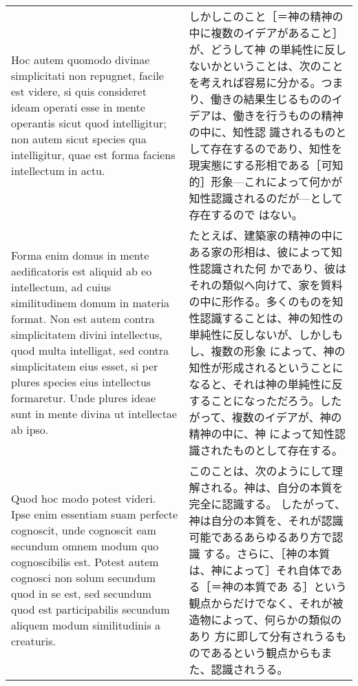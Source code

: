 \documentclass[10pt]{jsarticle} %
\begin{document}
\begin{longtable}{p{21em}p{21em}}
Hoc autem quomodo divinae simplicitati non repugnet, facile est
videre, si quis consideret ideam operati esse in mente operantis sicut
quod intelligitur; non autem sicut species qua intelligitur, quae est
forma faciens intellectum in actu.

&

しかしこのこと［＝神の精神の中に複数のイデアがあること］が、どうして神
の単純性に反しないかということは、次のことを考えれば容易に分かる。つま
り、働きの結果生じるもののイデアは、働きを行うものの精神の中に、知性認
識されるものとして存在するのであり、知性を現実態にする形相である［可知
的］形象---これによって何かが知性認識されるのだが---として存在するので
はない。


\\


Forma enim domus in mente aedificatoris est aliquid ab eo intellectum,
ad cuius similitudinem domum in materia format. Non est autem contra
simplicitatem divini intellectus, quod multa intelligat, sed contra
simplicitatem eius esset, si per plures species eius intellectus
formaretur. Unde plures ideae sunt in mente divina ut intellectae ab
ipso.


&

たとえば、建築家の精神の中にある家の形相は、彼によって知性認識された何
かであり、彼はそれの類似へ向けて、家を質料の中に形作る。多くのものを知
性認識することは、神の知性の単純性に反しないが、しかしもし、複数の形象
によって、神の知性が形成されるということになると、それは神の単純性に反
することになっただろう。したがって、複数のイデアが、神の精神の中に、神
によって知性認識されたものとして存在する。


\\


Quod hoc modo potest videri. Ipse enim essentiam suam perfecte
cognoscit, unde cognoscit eam secundum omnem modum quo cognoscibilis
est. Potest autem cognosci non solum secundum quod in se est, sed
secundum quod est participabilis secundum aliquem modum similitudinis
a creaturis.

&

このことは、次のようにして理解される。神は、自分の本質を完全に認識する。
したがって、神は自分の本質を、それが認識可能であるあらゆるあり方で認識
する。さらに、［神の本質は、神によって］それ自体である［＝神の本質であ
る］という観点からだけでなく、それが被造物によって、何らかの類似のあり
方に即して分有されうるものであるという観点からもまた、認識されうる。

\\


\end{longtable}
\end{document}
